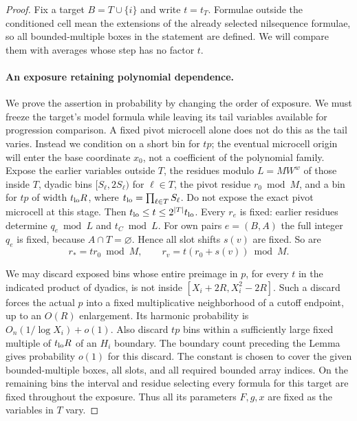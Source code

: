 \begin{proof}
Fix a target $B=T\cup\{i\}$ and write $t=t_T$.  Formulae outside
the conditioned cell mean the extensions of the already selected
nilsequence formulae, so all bounded-multiple boxes in the statement
are defined.  We will compare them with averages whose step has no
factor $t$.

\paragraph{An exposure retaining polynomial dependence.}
We prove the assertion in probability by changing the order of exposure.
We must freeze the target's model formula while leaving its tail
variables available for progression comparison.  A fixed pivot microcell
alone does not do this as the tail varies.  Instead we condition on a
short bin for $tp$;
the eventual microcell origin will enter the base coordinate $x_0$,
not a coefficient of the polynomial family.
Expose the earlier variables outside $T$, the residues modulo
$L=MW^w$ of those inside $T$, dyadic bins $[S_\ell,2S_\ell)$ for
$\ell\in T$, the pivot residue $r_0\bmod M$, and a bin for $tp$ of
width $t_{\rm lo}R$, where $t_{\rm lo}=\prod_{\ell\in T}S_\ell$.
Do not expose the exact pivot microcell at this stage.
Then $t_{\rm lo}\le t\le2^{|T|}t_{\rm lo}$.  Every $r_e$ is
fixed: earlier residues determine $q_e\bmod L$ and $t_C\bmod L$.
For own pairs $e=(B,A)$ the full integer $q_e$ is fixed, because
$A\cap T=\varnothing$.  Hence all slot shifts $s(v)$ are fixed.
So are
\[
 r_*=tr_0\bmod M,\qquad r_v=t(r_0+s(v))\bmod M.
\]

We may discard exposed bins whose entire preimage in $p$, for every
$t$ in the indicated product of dyadics, is not inside
$[X_i+2R,X_i^2-2R]$.  Such a discard forces the actual $p$ into a
fixed multiplicative neighborhood of a cutoff endpoint, up to an
$O(R)$ enlargement.  Its harmonic probability is
$O_n(1/\log X_i)+o(1)$.  Also discard $tp$ bins within a sufficiently
large fixed multiple of $t_{\rm lo}R$ of an $H_i$ boundary.  The
boundary count preceding the Lemma gives probability $o(1)$ for
this discard.  The constant is chosen to cover the given
bounded-multiple boxes, all slots, and all required bounded array
indices.  On the remaining bins the interval and residue selecting
every formula for this target are fixed throughout the exposure.
Thus all its parameters $F,g,x$ are fixed as the variables in $T$
vary.


\end{proof}
